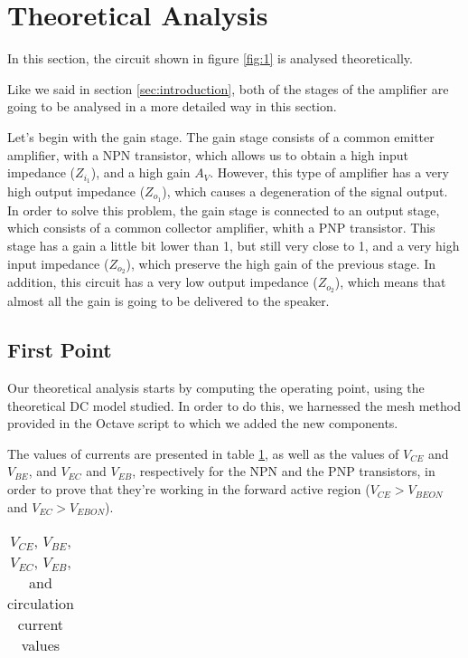 \section{Theoretical Analysis}
\label{sec:theoretical}

\par In this section, the circuit shown in figure \ref{fig:1} is analysed theoretically.
\par Like we said in section \ref{sec:introduction}, both of the stages of the amplifier are going to be analysed in a more detailed way in this section.
\par Let's begin with the gain stage. The gain stage consists of a common emitter amplifier, with a NPN transistor, which allows us to obtain a high input impedance ($Z_{i_1}$), and a high gain $A_V$. However, this type of amplifier has a very high output impedance ($Z_{o_1}$), which causes a degeneration of the signal output. In order to solve this problem, the gain stage is connected to an output stage, which consists of a common collector amplifier, whith a PNP transistor. This stage has a gain a little bit lower than 1, but still very close to 1, and a very high input impedance ($Z_{o_2}$), which preserve the high gain of the previous stage. In addition, this circuit has a very low output impedance ($Z_{o_2}$), which means that almost all the gain is going to be delivered to the speaker.

\subsection{First Point}

\par Our theoretical analysis starts by computing the operating point, using the theoretical DC model studied. In order to do this, we harnessed the mesh method provided in the Octave script to which we added the new components.
\par The values of currents are presented in table \ref{tab:currents}, as well as the values of $V_{CE}$ and $V_{BE}$, and $V_{EC}$ and $V_{EB}$, respectively for the NPN and the PNP transistors, in order to prove that they're working in the forward active region ($V_{CE} > V_{BEON}$ and $V_{EC} > V_{EBON}$).


\vspace{5mm}
\begin{table}[H]
	\centering
	\begin{tabularx}{0.9\textwidth} {
 	    | >{\raggedright\arraybackslash}X
  	    | >{\raggedleft\arraybackslash}X | }
	\hline
	
	\end{tabularx}
	\caption{$V_{CE}$, $V_{BE}$, $V_{EC}$, $V_{EB}$, and circulation current values}
	\label{tab:currents}
\end{table}
\vspace{5mm}

